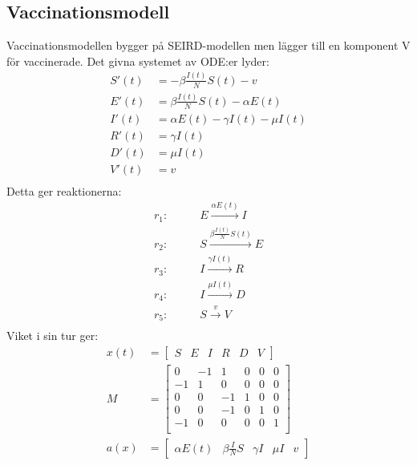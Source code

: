 \documentclass[11pt,a4paper]{article}
\begin{document}
\subsection{Vaccinationsmodell}
Vaccinationsmodellen bygger på SEIRD-modellen men lägger till en komponent V för vaccinerade.
Det givna systemet av ODE:er lyder:
\begin{align*}
    S'(t) & = -\beta \frac{I(t)}{N} S(t) - v          \\
    E'(t) & = \beta \frac{I(t)}{N} S(t) - \alpha E(t) \\
    I'(t) & = \alpha E(t) - \gamma I(t) - \mu I(t)    \\
    R'(t) & = \gamma I(t)                             \\
    D'(t) & = \mu I(t)                                \\
    V'(t) & = v                                       \\
\end{align*}
Detta ger reaktionerna:
\begin{align*}
    r_1: \qquad & E \xrightarrow{\alpha E(t)} I               \\
    r_2: \qquad & S \xrightarrow{\beta \frac{I(t)}{N} S(t)} E \\
    r_3: \qquad & I \xrightarrow{\gamma I(t)} R               \\
    r_4: \qquad & I \xrightarrow{\mu I(t)} D                  \\
    r_5: \qquad & S \xrightarrow{v} V                         \\
\end{align*}
Viket i sin tur ger:
\begin{align*}
    x(t) & = \begin{bmatrix} S & E & I & R & D & V \end{bmatrix}                                    \\
    M    & = \begin{bmatrix}
                 0  & -1 & 1  & 0 & 0 & 0 \\
                 -1 & 1  & 0  & 0 & 0 & 0 \\
                 0  & 0  & -1 & 1 & 0 & 0 \\
                 0  & 0  & -1 & 0 & 1 & 0 \\
                 -1 & 0  & 0  & 0 & 0 & 1 \\
             \end{bmatrix}                                                               \\
    a(x) & = \begin{bmatrix} \alpha E(t) & \beta \frac{I}{N} S & \gamma I & \mu I & v \end{bmatrix} \\
\end{align*}
\end{document}
